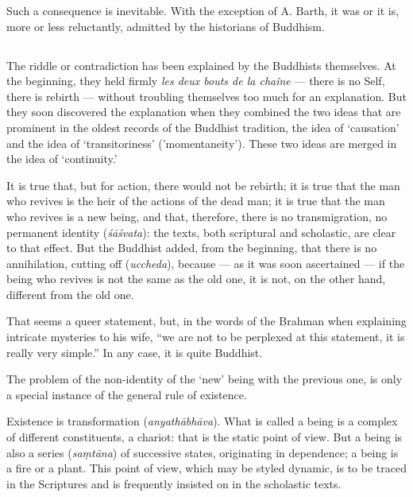 \documentclass[a4paper, 11pt, oneside, english]{article}
\begin{document}
Such a consequence is inevitable. With the exception of A. Barth, it was or it is, more or less reluctantly, admitted by the historians of Buddhism.

\subsection{}
\paragraph{}
The riddle or contradiction has been explained by the Buddhists themselves. At the beginning, they held firmly \emph{les deux bouts de la chaîne} --- there is no Self, there is rebirth --- without troubling themselves too much for an explanation. But they soon discovered the explanation when they combined the two ideas that are prominent in the oldest records of the Buddhist tradition, the idea of `causation' and the idea of `transitoriness' ('momentaneity'). These two ideas are merged in the idea of `continuity.'

It is true that, but for action, there would not be rebirth; it is true that the man who revives is the heir of the actions of the dead man; it is true that the man who revives is a new being, and that, therefore, there is no transmigration, no permanent identity (\emph{śāśvata}): the texts, both scriptural and scholastic, are clear to that effect. But the Buddhist added, from the beginning, that there is no annihilation, cutting off (\emph{uccheda}), because --- as it was soon ascertained --- if the being who revives is not the same as the old one, it is not, on the other hand, different from the old one.

That seems a queer statement, but, in the words of the Brahman when explaining intricate mysteries to his wife, ``we are not to be perplexed at this statement, it is really very simple.'' In any case, it is quite Buddhist.

The problem of the non-identity of the `new' being with the previous one, is only a special instance of the general rule of existence.

Existence is transformation (\emph{anyathābhāva}). What is called a being is a complex of different constituents, a chariot: that is the static point of view. But a being is also a series (\emph{saṃtāna}) of successive states, originating in dependence; a being is a fire or a plant. This point of view, which may be styled dynamic, is to be traced in the Scriptures and is frequently insisted on in the scholastic texts.
\end{document}
